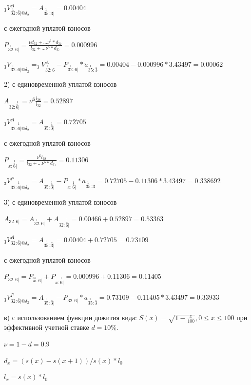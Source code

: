 \documentclass[12pt,a4paper, oneside]{extreport}
\begin{document}
$_3V_{  \overset{1}{32} : \bar{6}|@\delta_2}^A = A_{  \overset{1}{35} : \bar{3}|} = 0.00404 $

с ежегодной уплатой взносов

$ P_{ \overset{1}{32} : \bar{6}|} = \frac{\nu d_{32} + ... \nu^6*d_{37}}{l_{32} + ... \nu^5*d_{37}} = 0.000996$

$_3V_{  \overset{1}{32} : \bar{6}|@\delta_2} = _3V_{  \overset{1}{32} : \bar{6}}^A -  P_{ \overset{1}{32} : \bar{6}|} * \ddot{a}_{  \overset{1}{35} : \bar{3}} = 0.00404 -  0.000996 * 3.43497 = 0.00062 $


2) с единовременной уплатой взносов

$ A_{32:  \overset{1}{\bar{6}}|} = \nu^6 \frac{l_{38}}{l_{32}} = 0.52897$

$_3V_{32:  \overset{1}{\bar{6}}|@\delta_2}^A = A_{35:  \overset{1}{\bar{3}}|} = 0.72705$

с ежегодной уплатой взносов


$ P_{ x:  \overset{1}{\bar{6}}|} = \frac{\nu^6l_{38}}{l_{32} + ... \nu^5*d_{37}}= 0.11306$


$_3V_{  32:  \overset{1}{\bar{6}}|@\delta_2}^P = A_{35:  \overset{1}{\bar{3}}|} - P_{ x:  \overset{1}{\bar{6}}|}*\ddot{a}_{  \overset{1}{35} : \bar{3}} =   0.72705  -  0.11306 * 3.43497  = 0.338692$



3) с единовременной уплатой взносов 

$ A_{32: \bar{6}|} = A_{  \overset{1}{32} : \bar{6}|} + A_{32:  \overset{1}{\bar{6}}|} = 0.00466 + 0.52897 = 0.53363$


$_3V_{ 32: \bar{6}|@\delta_2}^A = A_{  \overset{1}{35} : \bar{3}|} =  0.00404 + 0.72705 =  0.73109$

с ежегодной уплатой взносов

$ P_{ 32:  \bar{6}| } = P_{ \overset{32}{x} : \bar{6}|} +  P_{ x:  \overset{1}{\bar{6}}|}  = 0.000996 + 0.11306 = 0.11405$


$_3V_{ 32: \bar{6}|@\delta_2}^P = A_{  \overset{1}{35} : \bar{3}|} - P_{ 32:  \bar{6}| } * \ddot{a}_{  \overset{1}{35} : \bar{3}} =  0.73109 -  0.11405 * 3.43497 = 0.33933 $




в) с использованием функции дожития вида:
$S(x) = \sqrt{1-\frac{x}{100}}, 0 \leq x \leq 100$ 
при эффективной учетной ставке $d=10\%$.

$\nu  = 1-d = 0.9$

$d_x = (s(x) - s(x+1))/ s(x) * l_0$

$l_x = s(x) * l_0$
\end{document}
